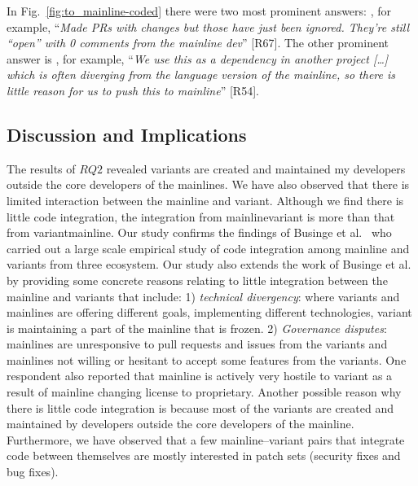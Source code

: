 In Fig.~\ref{fig:to_mainline-coded} there were two most prominent answers: , for example, ``\textit{Made PRs with changes but those have just been ignored. They're still ``open'' with 0 comments from the mainline dev}'' [R67]. The other prominent answer is , for example, ``\emph{We use this as a dependency in another project [\ldots] which is often diverging from the language version of the mainline, so there is little reason for us to push this to mainline}'' [R54]. %

\subsection{Discussion and Implications}

The results of $RQ2$ revealed variants are created and maintained my developers outside the core developers of the mainlines.
We have also observed that there is limited interaction between the mainline and variant.
Although we find there is little code integration, the integration from mainline\ra variant is more than that from variant\ra mainline.
Our study confirms the findings of Businge et al.~\cite{businge:emse:2021} who carried out a large scale empirical study of code integration among mainline and variants from three ecosystem. Our study also extends the work of Businge et al.~\cite{businge:emse:2021} by providing some concrete reasons relating to little integration between the mainline and variants that include: 1) \textit{technical divergency}: where variants and mainlines are offering different goals, implementing different technologies, variant is maintaining a part of the mainline that is frozen. 2) \textit{Governance disputes}: mainlines are unresponsive to pull requests and issues from the variants and  mainlines not willing or hesitant to accept some features from the variants. One respondent also reported that mainline is actively very hostile to variant as a result of mainline changing license to proprietary.
Another possible reason why there is little code integration is because most of the variants are created and maintained by developers outside the core developers of the mainline.
Furthermore, we have observed that a few mainline--variant pairs that integrate code between themselves are mostly interested in patch sets (security fixes and bug fixes).

